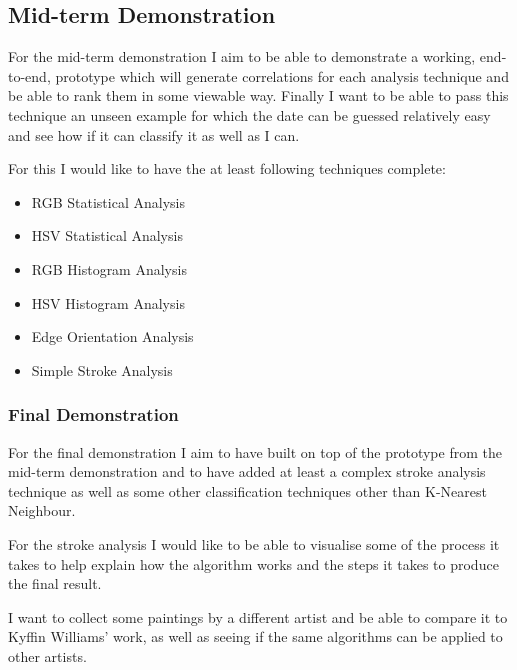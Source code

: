 \documentclass[11pt,fleqn,twoside]{article}
\begin{document}
\clearpage
\subsection{Mid-term Demonstration}
For the mid-term demonstration I aim to be able to demonstrate a working, end-to-end, prototype
which will generate correlations for each analysis technique and be able to rank them in some
viewable way. Finally I want to be able to pass this technique an unseen example for which the date
can be guessed relatively easy and see how if it can classify it as well as I can.

For this I would like to have the at least following techniques complete:

\begin{itemize}
\item RGB Statistical Analysis
\item HSV Statistical Analysis
\item RGB Histogram Analysis
\item HSV Histogram Analysis
\item Edge Orientation Analysis
\item Simple Stroke Analysis
\end{itemize}

\subsubsection{Final Demonstration}
For the final demonstration I aim to have built on top of the prototype from the mid-term 
demonstration and to have added at least a complex stroke analysis technique as well as some
other classification techniques other than K-Nearest Neighbour.

For the stroke analysis I would like to be able to visualise some of the process it takes to help 
explain how the algorithm works and the steps it takes to produce the final result.

I want to collect some paintings by a different artist and be able to compare it to Kyffin 
Williams' work, as well as seeing if the same algorithms can be applied to other artists.

%

\end{document}
